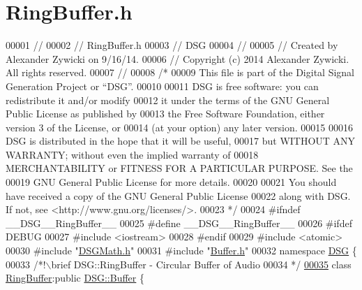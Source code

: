 \hypertarget{_ring_buffer_8h_source}{\section{Ring\+Buffer.\+h}
\label{_ring_buffer_8h_source}
}

\begin{DoxyCode}
00001 \textcolor{comment}{//}
00002 \textcolor{comment}{//  RingBuffer.h}
00003 \textcolor{comment}{//  DSG}
00004 \textcolor{comment}{//}
00005 \textcolor{comment}{//  Created by Alexander Zywicki on 9/16/14.}
00006 \textcolor{comment}{//  Copyright (c) 2014 Alexander Zywicki. All rights reserved.}
00007 \textcolor{comment}{//}
00008 \textcolor{comment}{/*}
00009 \textcolor{comment}{ This file is part of the Digital Signal Generation Project or “DSG”.}
00010 \textcolor{comment}{}
00011 \textcolor{comment}{ DSG is free software: you can redistribute it and/or modify}
00012 \textcolor{comment}{ it under the terms of the GNU General Public License as published by}
00013 \textcolor{comment}{ the Free Software Foundation, either version 3 of the License, or}
00014 \textcolor{comment}{ (at your option) any later version.}
00015 \textcolor{comment}{}
00016 \textcolor{comment}{ DSG is distributed in the hope that it will be useful,}
00017 \textcolor{comment}{ but WITHOUT ANY WARRANTY; without even the implied warranty of}
00018 \textcolor{comment}{ MERCHANTABILITY or FITNESS FOR A PARTICULAR PURPOSE.  See the}
00019 \textcolor{comment}{ GNU General Public License for more details.}
00020 \textcolor{comment}{}
00021 \textcolor{comment}{ You should have received a copy of the GNU General Public License}
00022 \textcolor{comment}{ along with DSG.  If not, see <http://www.gnu.org/licenses/>.}
00023 \textcolor{comment}{ */}
00024 \textcolor{preprocessor}{#ifndef \_\_DSG\_\_RingBuffer\_\_}
00025 \textcolor{preprocessor}{#define \_\_DSG\_\_RingBuffer\_\_}
00026 \textcolor{preprocessor}{#ifdef DEBUG}
00027 \textcolor{preprocessor}{#include <iostream>}
00028 \textcolor{preprocessor}{#endif}
00029 \textcolor{preprocessor}{#include <atomic>}
00030 \textcolor{preprocessor}{#include "\hyperlink{_d_s_g_math_8h}{DSGMath.h}"}
00031 \textcolor{preprocessor}{#include "\hyperlink{_buffer_8h}{Buffer.h}"}
00032 \textcolor{keyword}{namespace }\hyperlink{namespace_d_s_g}{DSG} \{\textcolor{comment}{}
00033 \textcolor{comment}{    /*!\(\backslash\)brief DSG::RingBuffer - Circular Buffer of Audio}
00034 \textcolor{comment}{     */}
\hypertarget{_ring_buffer_8h_source_l00035}{}\hyperlink{class_d_s_g_1_1_ring_buffer}{00035}     \textcolor{keyword}{class }\hyperlink{class_d_s_g_1_1_ring_buffer}{RingBuffer}:\textcolor{keyword}{public} \hyperlink{class_d_s_g_1_1_buffer}{DSG::Buffer} \{

\end{DoxyCode}
